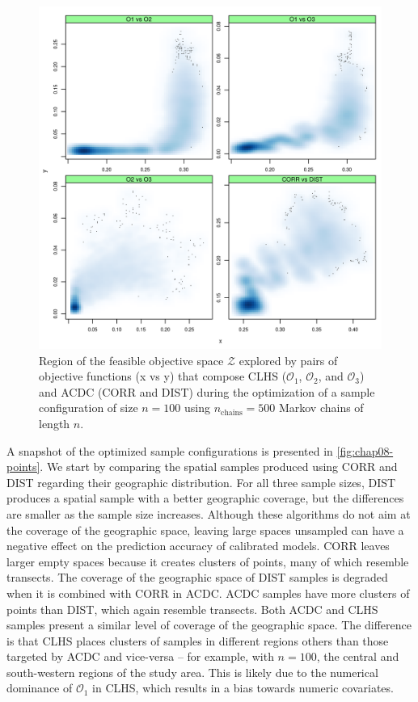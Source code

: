 \begin{figure}[!ht]
 \centering
 \includegraphics[width=\textwidth]{fig/chap08-energy-acdc-clhs}

 \caption[Region of the feasible objective space explored by pairs of objective functions that compose CLHS 
 and ACDC.]{Region of the feasible objective space $\mathcal{Z}$ explored by pairs of objective functions (x 
 vs  y) that compose CLHS ($\mathcal{O}_1$, $\mathcal{O}_2$, and $\mathcal{O}_3$) and ACDC (CORR and DIST)  
 during the optimization of a sample configuration of size $n = 100$ using $n_{\text{chains}} = 500$ Markov 
 chains of length $n$.}
 \label{fig:chap08-energy-acdc-clhs}
\end{figure}

A snapshot of the optimized sample configurations is presented in \autoref{fig:chap08-points}. We start by 
comparing the spatial samples produced using CORR and DIST regarding their geographic distribution. For all 
three sample sizes, DIST produces a spatial sample with a better geographic coverage, but the differences are
smaller as the sample size increases. Although these algorithms do not aim at the coverage of the geographic 
space, leaving large spaces unsampled can have a negative effect on the prediction accuracy of calibrated 
models. CORR leaves larger empty spaces because it creates clusters of points, many of which resemble 
transects. The coverage of the geographic space of DIST samples is degraded when it is combined with CORR in 
ACDC. 
ACDC samples have more clusters of points than DIST, which again resemble transects. Both ACDC and CLHS 
samples present a similar level of coverage of the geographic space. The difference is that CLHS places 
clusters of samples in different regions others than those targeted by ACDC and vice-versa -- for example, with 
$n = 
100$, the central and south-western regions of the study area. This is likely due to the numerical 
dominance of $\mathcal{O}_1$ in CLHS, which results in a bias towards numeric covariates.

